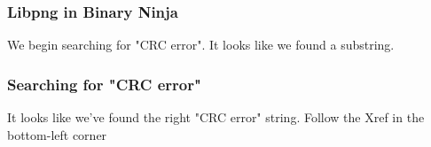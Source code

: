 \documentclass{beamer}
\begin{document}
\begin{frame}
\frametitle{Libpng in Binary Ninja}
  \small{We begin searching for "CRC error". It looks like we found a
    substring.}
\end{frame}

\begin{frame}
\frametitle{Searching for "CRC error"}
  \small{It looks like we've found the right "CRC error" string. Follow the Xref
    in the bottom-left corner}
\end{frame}
\end{document}

